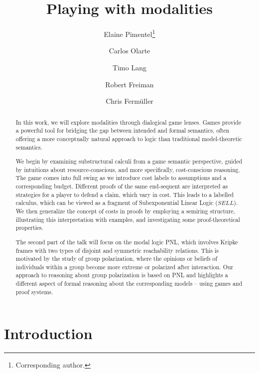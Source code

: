 \documentclass[a4paper,UKenglish,cleveref, autoref, thm-restate]{lipics-v2021}
\title{Playing with modalities}
\author{Elaine Pimentel\footnote{Corresponding author.}}{Computer Science Department UCL, UK \and \url{https://sites.google.com/site/elainepimentel/} }{e.pimentel@ucl.ac.uk}{https://orcid.org/0000-0002-7113-0801}{Pimentel has received funding from the European Union's Horizon 2020 research and innovation programme under the Marie Sk\l odowska-Curie grant agreement Number 101007627 and by the Leverhulme Project ECUMENICAL.}
\author{Carlos Olarte}{LIPN, CNRS UMR 7030, Universit\'{e} Sorbonne Paris Nord, France \and \url{https://sites.google.com/site/carlosolarte/} }{olarte@lipn.univ-paris13.fr}{https://orcid.org/0000-0002-7264-7773}{The work of Olarte has been partially supported by the SGR project PROMUEVA (BPIN
2021000100160) under the supervision of Minciencias (Ministerio de Ciencia Tecnolog\'ia e Innovaci\'on, Colombia). Olarte acknowledge also support from the NATO
Science for Peace
and Security Programme through grant number G6133 (project SymSafe). }
\author{Timo Lang}{Computer Science Department UCL, UK}{}{}{}
\author{Robert Freiman}{TU-Wien, Austria}{robert@logic.at}{}{}{}
\author{Chris Ferm\"{u}ller}{TU-Wien, Austria}{chrisf@logic.at}{}{}{}
\begin{document}
\maketitle

\begin{abstract}
In this work, we will explore modalities through dialogical game lenses. Games provide a powerful tool for bridging the gap between intended and formal semantics, often offering a more conceptually natural approach to logic than traditional model-theoretic semantics.

We begin by examining substructural calculi from a game semantic perspective, guided by intuitions about resource-conscious, and more specifically, cost-conscious reasoning. The game comes into full swing as we introduce cost labels to assumptions and a corresponding budget. Different proofs of the same end-sequent are interpreted as strategies for a player to defend a claim, which vary in cost. This leads to a labelled calculus, which can be viewed as a fragment of Subexponential Linear Logic ($SELL$). We then generalize the concept of costs in proofs by employing a semiring structure, illustrating this interpretation with examples, and investigating some proof-theoretical properties.

The second part of the talk will focus on the modal logic PNL, which involves Kripke frames with two types of disjoint and symmetric reachability relations. This is motivated by the study of group polarization, where the opinions or beliefs of individuals within a group become more extreme or polarized after interaction. Our approach to reasoning about group polarization is based on PNL and highlights a different aspect of formal reasoning about the corresponding models -- using games and proof systems.
\end{abstract}

\section{Introduction}\label{sec:introduction}
%
%
%
%
%
%
%
%
%
%
%
%
%


\end{document}
